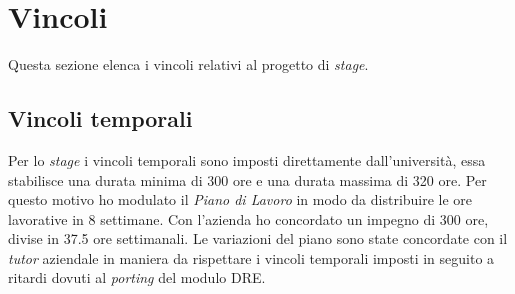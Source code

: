 \section{Vincoli}
Questa sezione elenca i vincoli relativi al progetto di \emph{stage}.
\subsection{Vincoli temporali}
Per lo \emph{stage} i vincoli temporali sono imposti direttamente dall'università, essa stabilisce una durata minima di 300 ore e una durata massima di 320 ore. Per questo motivo ho modulato il \emph{Piano di Lavoro} in modo da distribuire le ore lavorative in 8 settimane. Con l'azienda ho concordato un impegno di 300 ore, divise in 37.5 ore settimanali. Le variazioni del piano sono state concordate con il \emph{tutor} aziendale in maniera da rispettare i vincoli temporali imposti in seguito a ritardi dovuti al \emph{porting} del modulo DRE.
